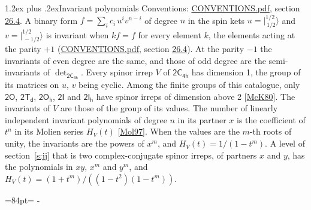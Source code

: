 \documentclass[10pt,a4paper]{article}
\makeatletter
\renewcommand\section{\@startsection{section}{1}{\z@}{-3ex plus -1ex minus -.2ex}%
  {1.2ex plus .2ex}{\normalfont\large\sffamily\bfseries\color{parttitle}}}
\newcommand{\needspace}[1]{\par\penalty-100\begingroup\dimen0=#1\relax\dimen2=\pagegoal
  \advance\dimen2-\pagetotal\ifdim\dimen0>\dimen2\relax\ifdim\dimen2>0pt\vfil\break\fi\fi
  \endgroup}
\numberwithin{equation}{section}
\newcommand{\grp}[1]{\mathsf{#1}}
\newcommand{\jm}[2]{\bigl\lvert{}^{#1}_{\,#2}\bigr\rangle}
\makeatother
\begin{document}
\section{Invariant polynomials}\label{s:invariants}
Conventions: \href{../../CONVENTIONS.pdf}{CONVENTIONS.pdf}, section \href{../../CONVENTIONS.pdf\#conv.26.4}{26.4}.
\leavevmode\label{n:local.binary.form}A binary form $f = \sum_i c_i\, u^i v^{n-i}$ of degree $n$ in the spin kets $u = \jm{1/2}{1/2}$ and $v = \jm{1/2}{-1/2}$ is invariant when $k f = f$ for every element $k$, the elements acting at the parity $+1$ (\href{../../CONVENTIONS.pdf}{CONVENTIONS.pdf}, section \href{../../CONVENTIONS.pdf\#conv.26.4}{26.4}). At the parity $-1$ the invariants of even degree are the same, and those of odd degree are the semi-invariants of $\det_{\grp{2C_{4h}}}$.
\leavevmode\label{n:function.hilbert}Every spinor irrep $V$ of $\grp{2C_{4h}}$ has dimension 1, the group of its matrices on $u$, $v$ being cyclic. Among the finite groups of this catalogue, only $\grp{2O}$, $\grp{2T_{d}}$, $\grp{2O_{h}}$, $\grp{2I}$ and $\grp{2I_{h}}$ have spinor irreps of dimension above 2 [\href{../../../REFERENCES.pdf\#ref.McK80}{McK80}]. The invariants of $V$ are those of the group of its values. \label{n:local.partner.x}The number of linearly independent invariant polynomials of degree $n$ in its partner $x$ is the coefficient of $t^n$ in its Molien series $H_V(t)$ [\href{../../../REFERENCES.pdf\#ref.Mol97}{Mol97}]. When the values are the $m$-th roots of unity, the invariants are the powers of $x^{m}$, and $H_V(t) = 1/(1 - t^{m})$. A level of section~\ref{s:jj} that is two complex-conjugate spinor irreps, of partners $x$ and $y$, has the polynomials in $xy$, $x^{m}$ and $y^{m}$, and $H_V(t) = (1 + t^{m})/((1 - t^{2})(1 - t^{m}))$.
\needspace{84pt}
\end{document}
